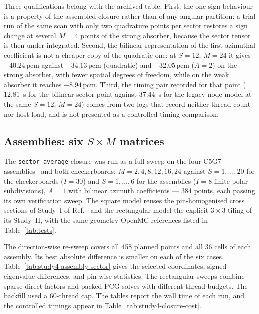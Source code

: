 \documentclass[11pt,a4paper]{article}
\newcommand{\pcm}{\,\mathrm{pcm}}
\begin{document}


Three qualifications belong with the archived table. First, the one-sign behaviour is a
property of the assembled closure rather than of any angular partition: a trial run
of the same scan with only two quadrature points per sector restores a sign change at
several $M{=}4$ points of the strong absorber, because the sector tensor is then
under-integrated. Second, the bilinear representation of the first azimuthal
coefficient is not a cheaper copy of the quadratic one: at $S{=}12$, $M{=}24$ it gives
$-40.24\pcm$ against $-34.13\pcm$ (quadratic) and $-32.05\pcm$ ($A{=}2$) on the strong
absorber, with fewer spatial degrees of freedom, while on the weak absorber it
reaches $-8.94\pcm$. Third, the timing pair recorded for that point ($12.81$~s for the
bilinear sector point against $37.44$~s for the legacy node model at the same
$S{=}12$, $M{=}24$) comes from two logs that record neither thread count nor host
load, and is not presented as a controlled timing comparison.

\subsection{Assemblies: six $S\times M$ matrices}
\label{sec:assemblies}
The \texttt{sector\_average} closure was run as a full sweep on the four C5G7
assemblies~\cite{nea2003,c5g7td} and both checkerboards:
$M{=}2,4,8,12,16,24$ against $S{=}1,\ldots,20$ for the checkerboards
($I{=}30$) and $S{=}1,\ldots,6$ for the assemblies ($I{=}8$ finite polar
subdivisions), $A{=}1$ with bilinear azimuth coefficients --- 384 points, each passing
its own verification sweep. The square model reuses the pin-homogenised cross sections
of Study~I of Ref.~\cite{openpsn2026} and the rectangular model the explicit
$3\times3$ tiling of its Study~II, with the same-geometry OpenMC references listed in
Table~\ref{tab:tests}.




The direction-wise re-sweep covers all 458 planned points and all 36 cells of each
assembly. Its best absolute difference is smaller on each of the six cases.
Table~\ref{tab:study4-assembly-sector} gives the selected coordinates, signed eigenvalue
differences, and pin-wise statistics. The rectangular sweeps combine sparse direct
factors and packed-PCG solves with different thread budgets. The backfill used a
60-thread cap. The tables report the wall time of each run, and the controlled
timings appear in Table~\ref{tab:study4-closure-cost}.
\end{document}
